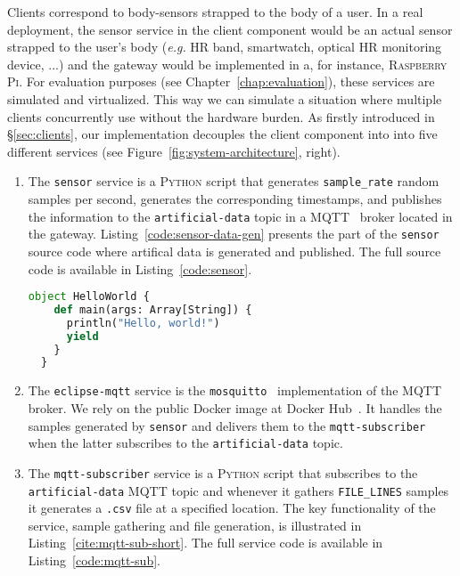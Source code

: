 Clients correspond to body-sensors strapped to the body of a user. 
In a real deployment, the sensor service in the client component would be an actual sensor strapped to the user's body (\textit{e.g.} HR band, smartwatch, optical HR monitoring device, ...) and the gateway would be implemented in a, for instance, \textsc{Raspberry Pi}.
For evaluation purposes (see Chapter~\ref{chap:evaluation}), these services are simulated and virtualized.
This way we can simulate a situation where multiple clients concurrently use \projName without the hardware burden.
As firstly introduced in \S\ref{sec:clients}, our implementation decouples the client component into into five different services (see Figure~\ref{fig:system-architecture}, right). 
\begin{enumerate}
    \item The \texttt{sensor} service is a \textsc{Python} script that generates \texttt{sample\_rate} random samples per second, generates the corresponding timestamps, and publishes the information to the \texttt{artificial-data} topic in a \textsc{MQTT}~\cite{mqtt-protocol} broker located in the gateway. Listing~\ref{code:sensor-data-gen} presents the part of the \texttt{sensor} source code where artifical data is generated and published. The full source code is available in Listing~\ref{code:sensor}.
\begin{lstlisting}[language=Python,caption={Snippet illustrating the artificial data generation in the \texttt{sensor} service.},label=code:sensor-data-gen]
 object HelloWorld {
    def main(args: Array[String]) {
      println("Hello, world!")
      yield
    }
  }
\end{lstlisting}
    \item The \texttt{eclipse-mqtt} service is the \texttt{mosquitto}~\cite{mqtt-eclipse} implementation of the \textsc{MQTT} broker. We rely on the public Docker image at Docker Hub~\cite{mqtt-image}. It handles the samples generated by \texttt{sensor} and delivers them to the \texttt{mqtt-subscriber} when the latter subscribes to the \texttt{artificial-data} topic.
    \item The \texttt{mqtt-subscriber} service is a \textsc{Python} script that subscribes to the \texttt{artificial-data} \textsc{MQTT} topic and whenever it gathers \texttt{FILE\_LINES} samples it generates a \texttt{.csv} file at a specified location. The key functionality of the service, sample gathering and file generation, is illustrated in Listing~\ref{cite:mqtt-sub-short}. The full service code is available in Listing~\ref{code:mqtt-sub}.

\end{enumerate}
